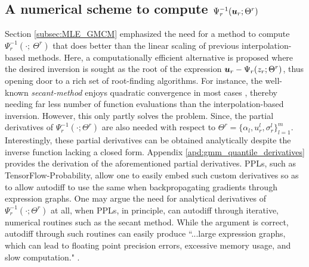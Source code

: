 \documentclass{article}
\theoremstyle{plain}
\theoremstyle{definition}
\theoremstyle{remark}
\begin{document}
\subsection{A numerical scheme to compute $\Psi^{-1}_r(\boldsymbol{u}_r;\Theta^r)$} \label{subsec:gmm_quantile}
Section \ref{subsec:MLE_GMCM} emphasized the need for a method to compute $\Psi^{-1}_r(\cdot ;\ \Theta^r)$ that does better than the linear scaling of previous interpolation-based methods. Here, a computationally efficient alternative is proposed where the desired inversion is sought as the root of the expression $\boldsymbol{u}_r-\Psi_r(z_r;\Theta^r)$, thus opening door to a rich set of root-finding algorithms. For instance, the well-known \emph{secant-method} enjoys quadratic convergence in most cases \citep{Pedro2003}, thereby needing far less number of function evaluations than the interpolation-based inversion. However, this only partly solves the problem. Since, the partial derivatives of $\Psi^{-1}_r(\cdot;\Theta^r)$ are also needed with respect to $\Theta^r=\{\alpha_l,u_r^l,\sigma_r^l\}_{l=1}^m$. Interestingly, these partial derivatives can be obtained analytically despite the inverse function lacking a closed form. Appendix \ref{apd:gmm_quantile_derivatives} provides the derivation of the aforementioned partial derivatives. PPLs, such as TensorFlow-Probability, allow one to easily embed such custom derivatives so as to allow autodiff to use the same when backpropagating gradients through expression graphs. One may argue the need for analytical derivatives of $\Psi^{-1}_r(\cdot;\Theta^r)$ at all, when PPLs, in principle, can autodiff through iterative, numerical routines such as the secant method. While the argument is correct, autodiff through such routines can easily produce ``...large expression graphs, which can lead to floating point precision errors, excessive memory usage, and slow computation." \citep{Margossian2018}. 
\end{document}
